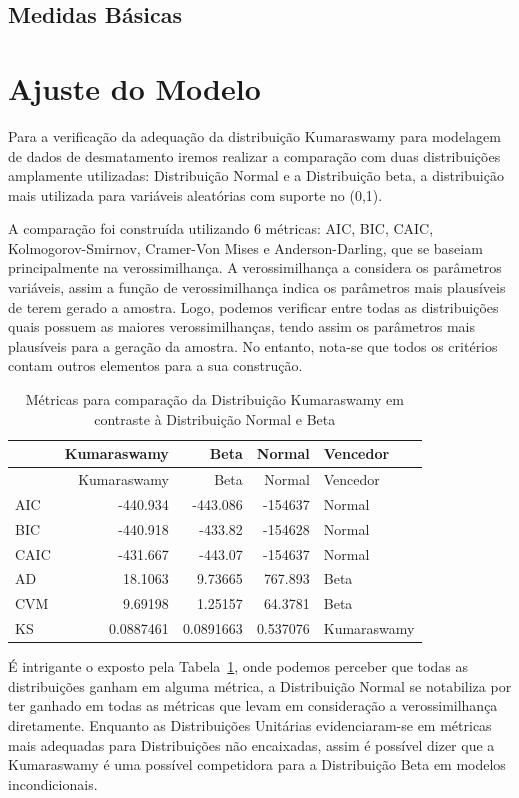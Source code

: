 \documentclass[
]{article}
\begin{document}
\subsection{Medidas Básicas}

\section{\centering Ajuste do Modelo}

Para a verificação da adequação da distribuição Kumaraswamy para
modelagem de dados de desmatamento iremos realizar a comparação com duas
distribuições amplamente utilizadas: Distribuição Normal e a
Distribuição beta, a distribuição mais utilizada para variáveis
aleatórias com suporte no (0,1).

A comparação foi construída utilizando 6 métricas: AIC, BIC, CAIC,
Kolmogorov-Smirnov, Cramer-Von Mises e Anderson-Darling, que se baseiam
principalmente na verossimilhança. A verossimilhança a considera os
parâmetros variáveis, assim a função de verossimilhança indica os
parâmetros mais plausíveis de terem gerado a amostra. Logo, podemos
verificar entre todas as distribuições quais possuem as maiores
verossimilhanças, tendo assim os parâmetros mais plausíveis para a
geração da amostra. No entanto, nota-se que todos os critérios contam
outros elementos para a sua construção.

\hypertarget{tbl-planet-measures}{}
\begin{longtable}[]{@{}lrrrl@{}}
\caption{\label{tbl-planet-measures}Métricas para comparação da
Distribuição Kumaraswamy em contraste à Distribuição Normal e
Beta}\tabularnewline
\toprule()
& Kumaraswamy & Beta & Normal & Vencedor \\
\midrule()
\endfirsthead
\toprule()
& Kumaraswamy & Beta & Normal & Vencedor \\
\midrule()
\endhead
AIC & -440.934 & -443.086 & -154637 & Normal \\
BIC & -440.918 & -433.82 & -154628 & Normal \\
CAIC & -431.667 & -443.07 & -154637 & Normal \\
AD & 18.1063 & 9.73665 & 767.893 & Beta \\
CVM & 9.69198 & 1.25157 & 64.3781 & Beta \\
KS & 0.0887461 & 0.0891663 & 0.537076 & Kumaraswamy \\
\bottomrule()
\end{longtable}

É intrigante o exposto pela Tabela~\ref{tbl-planet-measures}, onde
podemos perceber que todas as distribuições ganham em alguma métrica, a
Distribuição Normal se notabiliza por ter ganhado em todas as métricas
que levam em consideração a verossimilhança diretamente. Enquanto as
Distribuições Unitárias evidenciaram-se em métricas mais adequadas para
Distribuições não encaixadas, assim é possível dizer que a Kumaraswamy é
uma possível competidora para a Distribuição Beta em modelos
incondicionais.
\end{document}
